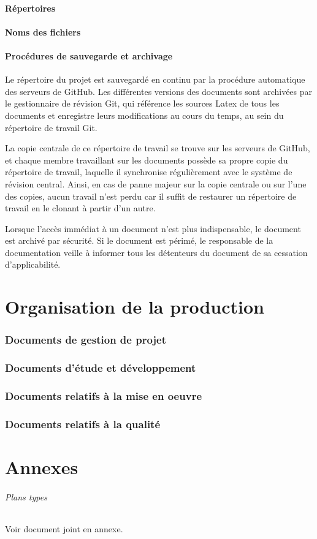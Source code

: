 \documentclass[a4paper]{article}
\begin{document}
\subsection{Répertoires}
\subsection{Noms des fichiers}
\subsection{Procédures de sauvegarde et archivage}

Le répertoire du projet est sauvegardé en continu par la procédure automatique des serveurs de GitHub. Les différentes versions des documents sont archivées par le gestionnaire de révision Git, qui référence les sources Latex de tous les documents et enregistre leurs modifications au cours du temps, au sein du répertoire de travail Git.

La copie centrale de ce répertoire de travail se trouve sur les serveurs de GitHub, et chaque membre travaillant sur les documents possède sa propre copie du répertoire de travail, laquelle il synchronise régulièrement avec le système de révision central. Ainsi, en cas de panne majeur sur la copie centrale ou sur l'une des copies, aucun travail n'est perdu car il suffit de restaurer un répertoire de travail en le clonant à partir d'un autre.

Lorsque l'accès immédiat à un document n'est plus indispensable, le document est archivé par sécurité. Si le document est périmé, le responsable de la documentation veille à informer tous les détenteurs du document de sa cessation d'applicabilité.

\part{Organisation de la production}

\section{Documents de gestion de projet}
\section{Documents d’étude et développement}
\section{Documents relatifs à la mise en oeuvre}
\section{Documents relatifs à la qualité}

\part{Annexes}

\paragraph{Plans types} Voir document joint en annexe.

\end{document}

